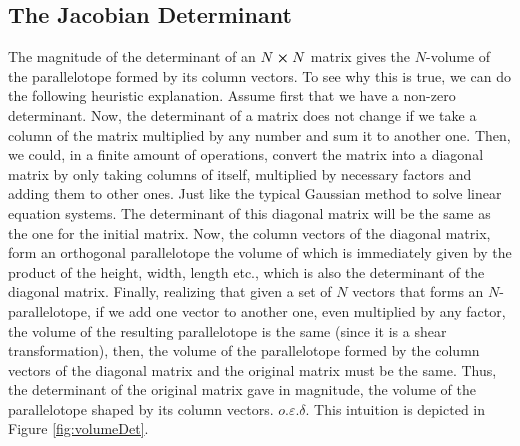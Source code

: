 \documentclass[11pt, a4paper]{article} %
\begin{document}
\subsection*{ The Jacobian Determinant}
The magnitude of the determinant of an $N\cross N$ matrix gives the $N$-volume of the parallelotope formed by its column vectors. To see why this is true, we can do the following heuristic explanation. Assume first that we have a non-zero determinant. Now, the determinant of a matrix does not change if we take a column of the matrix multiplied by any number and sum it to another one. Then, we could, in a finite amount of operations, convert the matrix into a diagonal matrix by only taking columns of itself, multiplied by necessary factors and adding them to other ones. Just like the typical Gaussian method to solve linear equation systems. The determinant of this diagonal matrix will be the same as the one for the initial matrix. Now, the column vectors of the diagonal matrix, form an orthogonal parallelotope the volume of which is immediately given by the product of the height, width, length etc., which is also the determinant of the diagonal matrix. Finally, realizing that given a set of $N$ vectors that forms an $N$-parallelotope, if we add one vector to another one, even multiplied by any factor, the volume of the resulting parallelotope is the same (since it is a shear transformation), then, the volume of the parallelotope formed by the column vectors of the diagonal matrix and the original matrix must be the same. Thus, the determinant of the original matrix gave in magnitude, the volume of the parallelotope shaped by its column vectors. $o.\varepsilon.\delta$. This intuition is depicted in Figure \ref{fig:volumeDet}.\vspace{0.2cm}
\end{document}
